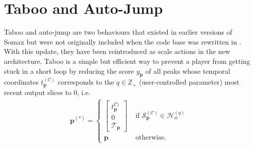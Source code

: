 \section{Taboo and Auto-Jump}
Taboo and auto-jump are two behaviours that existed in earlier versions of Somax but were not originally included when the code base was rewritten in \cite{borg_2019}. With this update, they have been reintroduced as scale actions in the new architecture. Taboo is a simple but efficient way to prevent a player from getting stuck in a short loop by reducing the score $y_{\bm p}$ of all peaks whose temporal coordinates $t_{\bm p}^{(\mathcal C)}$ corresponds to the $q \in \mathbb Z_+$ (user-controlled parameter) most recent output slices to 0, i.e.
	\begin{align}
		\bm p^{(\ast)} = \left\lbrace\begin{array}{cl}
				\begin{bmatrix} 
					t^{\mathcal C)}_{\bm p} \\ 0 \\ \mathcal T_{\bm p}
				\end{bmatrix} 
				& \text{ if } \mathcal S^{(\mathcal C)}_{\bm p} \in \mathcal H_w^{(q)}  \\ 
				\bm p & \text{ otherwise}.
			\end{array}\right.
	\end{align}
	
